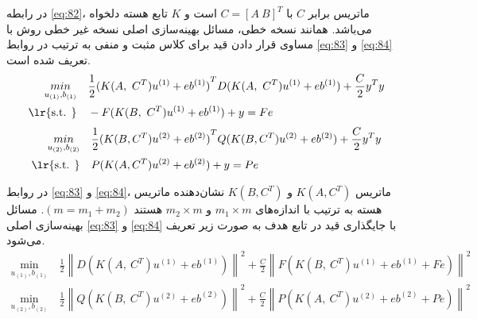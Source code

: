 در رابطه \ref{eq:82}، ماتریس برابر $C$ با  $C=\left[ A \  B \right]^{T}$ است و $K$  تابع هسته دلخواه می‌باشد. همانند نسخه خطی، مسائل بهینه‌سازی اصلی نسخه غیر خطی روش   با مساوی قرار دادن قید برای کلاس مثبت و منفی به ترتیب در روابط \ref{eq:83} و \ref{eq:84} تعریف شده است.
\begin{align}
\mathop{{ min}}\limits_{u_{(1)} ,b_{(1)}} \quad & \frac{1}{2}{{(K(A,~{{C}^{T}}){{u}^{\left( 1 \right)}}+e{{b}^{\left( 1 \right)}})}^{T}}D(K( A,~{{C}^{T}}){{u}^{\left( 1 \right)}} \nonumber +e{{b}^{\left( 1 \right)}}) +\frac{C}{2}{{y}^{T}}y \nonumber \\
\textrm{\lr{s.t. }} \quad & 	-F(K(B,~{{C}^{T}}){{u}^{\left( 1 \right)}}+e{{b}^{\left( 1 \right)}})+y=Fe
\label{eq:83}
\end{align}
\begin{align}
\mathop{{ min}}\limits_{u_{(2)} ,b_{(2)}} \quad & \frac{1}{2}{{(K(B,{{C}^{T}}){{u}^{(2)}}+e{{b}^{(2)}})}^{T}}Q(K(B,{{C}^{T}}){{u}^{(2)}} \nonumber +e{{b}^{(2)}})+\frac{C}{2}{{y}^{T}}y \nonumber \\
\textrm{\lr{s.t. }} \quad & P(K(A,{{C}^{T}}){{u}^{(2)}}+e{{b}^{(2)}})+y=Pe
\label{eq:84}
\end{align}

در روابط \ref{eq:83} و \ref{eq:84}، ماتریس  $K(A,{{C}^{T}})$ و $K(B,{{C}^{T}})$  نشان‌دهنده ماتریس هسته به ترتیب با اندازه‌های  $m_1 \times m$ و  $m_2 \times m$ هستند $(m=m_1+m_2)$. مسائل بهینه‌سازی اصلی \ref{eq:83} و \ref{eq:84} با جایگذاری قید در تابع هدف به صورت زیر تعریف می‌شود.
\begin{equation}\label{eq:85}
\begin{split}
\mathop{{ min}}\limits_{u_{(1)} ,b_{(1)}}~ & \frac{1}{2}\left\|D(K(A,~{{C}^{T}}){{u}^{\left( 1 \right)}}+e{{b}^{\left( 1 \right)}})\right\|^{2} +\frac{C}{2}\left\|F(K(B,~{{C}^{T}}){{u}^{\left( 1 \right)}}+e{{b}^{\left( 1 \right)}}+F{{e}})\right\|^{2}
\end{split}
\end{equation}
\begin{equation}\label{eq:86}
\begin{split}
\mathop{{ min}}\limits_{u_{(2)} ,b_{(2)}}~ & \frac{1}{2}\left\|Q(K(B,~{{C}^{T}} ){{u}^{\left( 2 \right)}}+e{{b}^{\left( 2 \right)}})\right\|^{2} +\frac{C}{2}\left\|P(K(A,~{{C}^{T}} ){{u}^{\left( 2 \right)}}+e{{b}^{\left( 2 \right)}}+P{{e}})\right\|^{2}
\end{split}
\end{equation}

